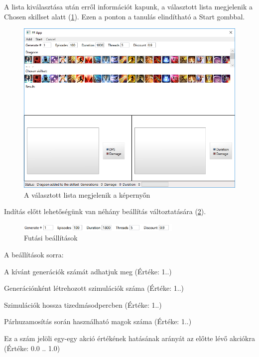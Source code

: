 \documentclass[12pt]{article}
\begin{document}
A lista kiválasztása után erről információt kapunk, a választott lista megjelenik a Chosen skillset alatt (\ref{fig:chosen}). Ezen a ponton a tanulás elindítható a Start gombbal.

\begin{figure}[H]
	\begin{center}
		\includegraphics[width=1\textwidth]{chosen}
	\end{center}
	\caption{A választott lista megjelenik a képernyőn}
	\label{fig:chosen}
\end{figure}

Indítás előtt lehetőségünk van néhány beállítás változtatására (\ref{fig:options}).

\begin{figure}[H]
	\begin{center}
		\includegraphics[width=0.7\textwidth]{options}
	\end{center}
	\caption{Futási beállítások}
	\label{fig:options}
\end{figure}

A beállítások sorra:

\begin{description}[align=right,labelwidth=3cm]
	 \item [Generate] A kívánt generációk számát adhatjuk meg (Értéke: 1..)
	 \item [Episodes] Generációnként létrehozott szimulációk száma (Értéke: 1..)
	 \item [Duration] Szimulációk hossza tizedmásodpercben (Értéke: 1..)
	 \item [Threads] Párhuzamosítás során használható magok száma (Értéke: 1..)
	 \item [Discount] Ez a szám jelöli egy-egy akció értékének hatásának arányát az előtte lévő akciókra (Értéke: 0.0 .. 1.0)
\end{description}
\end{document}
